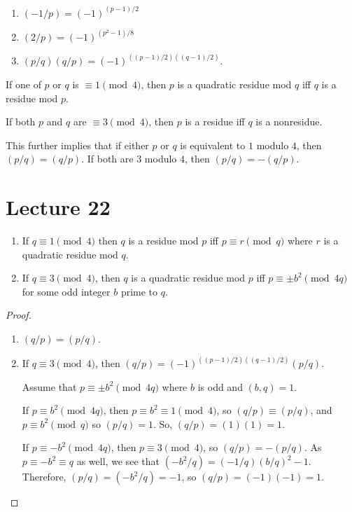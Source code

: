 \documentclass{article}
\begin{document}
\begin{theorem}
	\label{qr}
	\begin{enumerate}[label=(\alph*)] 
		\item $(-1 / p) = (-1)^{(p-1)/2}$
		\item $(2 / p) = (-1)^{(p^2-1)/8}$
		\item $(p/q)(q/p) = (-1)^{((p-1)/2)((q-1)/2)}$.
	\end{enumerate}

	If one of $p$ or $q$ is $\equiv 1 \pmod 4$, then $p$ is a quadratic residue mod $q$ iff $q$ is a residue mod $p$. 

	If both $p$ and $q$ are $\equiv 3 \pmod 4$, then $p$ is a residue iff $q$ is a nonresidue.
\end{theorem}

This further implies that if either $p$ or $q$ is equivalent to $1$ modulo $4$, then $(p/q) = (q/p)$. If both are $3$ modulo $4$, then $(p/q) = -(q/p)$. 

\section{Lecture 22}
\begin{theorem}
	\begin{enumerate}[label=(\roman*)] 
		\item If $q \equiv 1 \pmod 4$ then $q$ is a residue mod $p$ iff $p \equiv r \pmod q$ where $r$ is a quadratic residue mod $q$. 
		\item If $q \equiv 3 \pmod 4$, then $q$ is a quadratic residue mod $p$ iff $p \equiv \pm b^2 \pmod{4q}$ for some odd integer $b$ prime to $q$.
	\end{enumerate}
\end{theorem}

\begin{proof} 
	\begin{enumerate} 
		\item $(q / p) = (p / q)$.
		\item
			If $q \equiv 3 \pmod 4$, then $(q / p) = (-1)^{((p-1)/2)((q-1)/2)} (p/q)$.

			Assume that $p \equiv \pm b^2 \pmod{4q}$ where $b$ is odd and $(b, q) = 1$.

			If $p \equiv b^2 \pmod{4q}$, then $p \equiv b^2 \equiv 1 \pmod 4$, so $(q / p) \equiv (p / q)$, and $p \equiv b^2 \pmod q$ so $(p / q) = 1$. So, $(q / p) = (1)(1) = 1$.

			If $p \equiv -b^2 \pmod{4q}$, then $p \equiv 3 \pmod 4$, so $(q / p) = -(p / q)$. As $p \equiv -b^2 \equiv q$ as well, we see that $(-b^2 / q) = (-1 / q)(b / q)^2  -1$. Therefore, $(p / q) = (-b^2 / q) = -1$, so $(q / p) = (-1)(-1) = 1$.
	\end{enumerate}
\end{proof}
\end{document}
